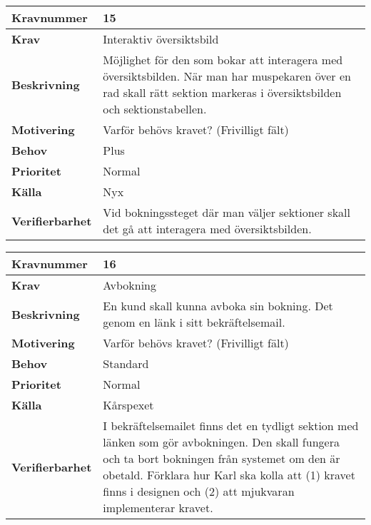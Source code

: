 \documentclass[a4paper, twoside, 11pt, titlepage]{article}
\begin{document}
\begin{tabular} { | p{3cm} | p{12.2cm} | }
	\hline
	\textbf{Kravnummer} & 15  \\
	\hline
	\textbf{Krav} & Interaktiv översiktsbild  \\
	\hline
	\textbf{Beskrivning} & Möjlighet för den som bokar att interagera med översiktsbilden. När man har muspekaren över en rad skall rätt sektion markeras i översiktsbilden och sektionstabellen.  \\
	\hline
	\textbf{Motivering} & Varför behövs kravet? (Frivilligt fält)  \\
	\hline
	\textbf{Behov} & Plus  \\
	\hline
	\textbf{Prioritet} & Normal  \\
	\hline
	\textbf{Källa} & Nyx  \\
	\hline
	\textbf{Verifierbarhet} & Vid bokningssteget där man väljer sektioner skall det gå att interagera med översiktsbilden.   \\
	\hline
\end{tabular}

\begin{tabular} { | p{3cm} | p{12.2cm} | }
	\hline
	\textbf{Kravnummer} & 16  \\
	\hline
	\textbf{Krav} & Avbokning  \\
	\hline
	\textbf{Beskrivning} & En kund skall kunna avboka sin bokning. Det genom en länk i sitt bekräftelsemail.  \\
	\hline
	\textbf{Motivering} & Varför behövs kravet? (Frivilligt fält)  \\
	\hline
	\textbf{Behov} & Standard  \\
	\hline
	\textbf{Prioritet} & Normal  \\
	\hline
	\textbf{Källa} & Kårspexet  \\
	\hline
	\textbf{Verifierbarhet} & I bekräftelsemailet finns det en tydligt sektion med länken som gör avbokningen. Den skall fungera och ta bort bokningen från systemet om den är obetald. Förklara hur Karl ska kolla att (1) kravet finns i designen och (2) att mjukvaran implementerar kravet.  \\
	\hline
\end{tabular}
\end{document}
